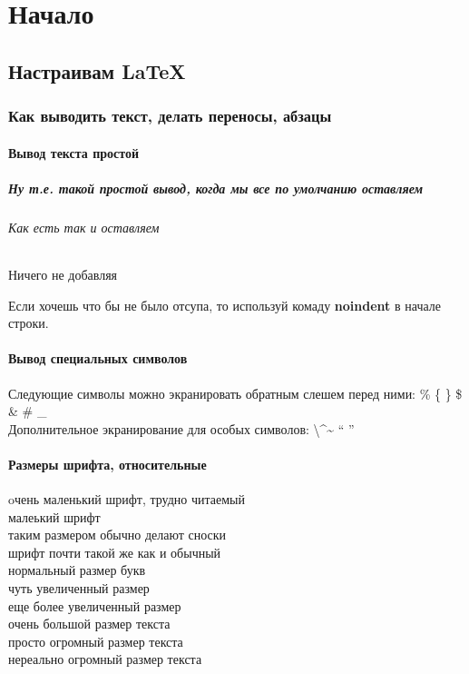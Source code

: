 \documentclass[oneside,final,14pt]{extreport}
\begin{document}
\part{Начало}
\chapter{Настраивам LaTeX}
\section{Как выводить текст, делать переносы, абзацы}
\subsection{Вывод текста простой}
\subsubsection{Ну т.е. такой простой вывод, когда мы все по умолчанию оставляем}
\paragraph{Как есть так и оставляем}
\subparagraph{Ничего не добавляя}
Если хочешь что бы не было отсупа, то используй комаду
\textbf{noindent} в начале строки.\newline
\subsection{Вывод специальных символов}
Следующие символы можно экранировать обратным слешем перед ними: \% \{ \} \$ \& \# \_ \\
Дополнительное экранирование для особых символов: \textbackslash  \textasciicircum \~{}  `` '' \\

\subsection{Размеры шрифта, относительные}
\tiny oчень маленький шрифт, трудно читаемый \\
\scriptsize малеький шрифт \\
\footnotesize таким размером обычно делают сноски \\
\small шрифт почти такой же как и обычный \\
\normalsize нормальный размер букв \\
\large чуть увеличенный размер \\
\Large еще более увеличенный размер \\
\LARGE очень большой размер текста \\
\huge просто огромный размер текста \\
\Huge нереально огромный размер текста \\
\normalsize
\end{document}
